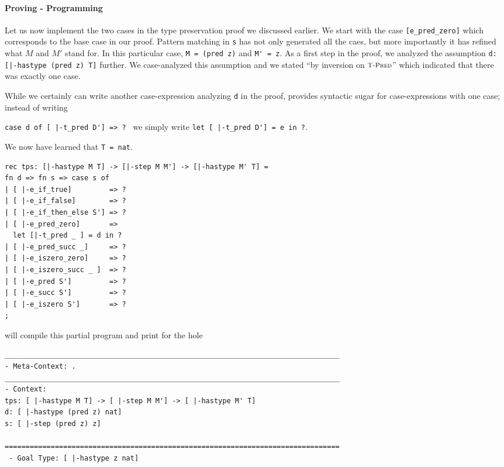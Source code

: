 \paragraph{Proving - Programming} Let us now implement the two cases
in the type preservation proof we discussed earlier. We start with the
case \lstinline![e_pred_zero]! which corresponds to the base case in
our proof. Pattern matching in \lstinline!s! has not only generated
all the caes, but more importantly it has refined what $M$ and $M'$
stand for. In this particular case, \lstinline!M = (pred z)! and
\lstinline!M' = z!. As a first step in the proof, we analyzed the assumption
\lstinline!d:[|-hastype (pred z) T]! further. We case-analyzed this
assumption and we stated ``by inversion on $\textsc{\footnotesize T-Pred}$'' which indicated
that there was exactly one case.

While we certainly can write another case-expression analyzing
\lstinline!d! in the proof, \beluga provides syntactic sugar for
case-expressions with one case; instead of writing

\noindent
\lstinline!case d of [ |-t_pred D'] => ? ! we simply write
\lstinline!let [ |-t_pred D'] = e in ?!.


We now have learned that \lstinline!T = nat!.

\begin{lstlisting}
rec tps: [|-hastype M T] -> [|-step M M'] -> [|-hastype M' T] =
fn d => fn s => case s of
| [ |-e_if_true]         => ?
| [ |-e_if_false]        => ?
| [ |-e_if_then_else S'] => ?
| [ |-e_pred_zero]       =>
  let [|-t_pred _ ] = d in ?
| [ |-e_pred_succ _]     => ?
| [ |-e_iszero_zero]     => ?
| [ |-e_iszero_succ _ ]  => ?
| [ |-e_pred S']         => ?
| [ |-e_succ S']         => ?
| [ |-e_iszero S']       => ?
;
\end{lstlisting}

\beluga will compile this partial program and print for the hole

\begin{lstlisting}
________________________________________________________________________________
- Meta-Context: .
________________________________________________________________________________
- Context:
tps: [ |-hastype M T] -> [ |-step M M'] -> [ |-hastype M' T]
d: [ |-hastype (pred z) nat]
s: [ |-step (pred z) z]

================================================================================
 - Goal Type: [ |-hastype z nat]

\end{lstlisting}



